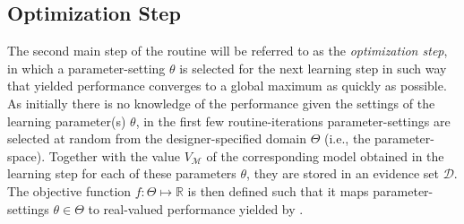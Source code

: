 
\subsection{Optimization Step}
\label{sec:optimization-step}

The second main step of the routine will be referred to as the \textit{optimization step}, in which a parameter-setting $\theta$ is selected for the next learning step in such way that yielded performance converges to a global maximum as quickly as possible.
As initially there is no knowledge of the performance given the settings of the learning parameter(s) $\theta$, in the first few routine-iterations parameter-settings are selected at random from the designer-specified domain $\Theta$ (i.e., the parameter-space).
Together with the value $V_{\mathcal{M}}$ of the corresponding model obtained in the learning step for each of these parameters $\theta$, they are stored in an evidence set $\mathcal{D}$.
The objective function $f: \Theta \mapsto \mathbb{R}$ is then defined such that it maps parameter-settings $\theta \in \Theta$ to real-valued performance yielded by .

